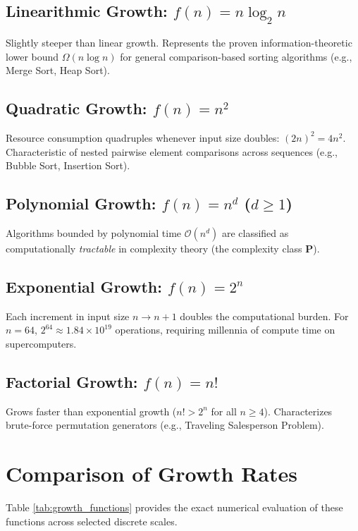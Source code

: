 \documentclass[11pt,a4paper,oneside]{report}
\theoremstyle{definition}
\begin{document}
\subsection{Linearithmic Growth: $f(n) = n \log_2 n$}
Slightly steeper than linear growth. Represents the proven information-theoretic lower bound $\Omega(n \log n)$ for general comparison-based sorting algorithms (e.g., Merge Sort, Heap Sort).

\subsection{Quadratic Growth: $f(n) = n^2$}
Resource consumption quadruples whenever input size doubles: $(2n)^2 = 4n^2$. Characteristic of nested pairwise element comparisons across sequences (e.g., Bubble Sort, Insertion Sort).

\subsection{Polynomial Growth: $f(n) = n^d$ ($d \ge 1$)}
Algorithms bounded by polynomial time $\mathcal{O}(n^d)$ are classified as computationally \emph{tractable} in complexity theory (the complexity class $\mathbf{P}$).

\subsection{Exponential Growth: $f(n) = 2^n$}
Each increment in input size $n \to n + 1$ doubles the computational burden. For $n = 64$, $2^{64} \approx 1.84 \times 10^{19}$ operations, requiring millennia of compute time on supercomputers.

\subsection{Factorial Growth: $f(n) = n!$}
Grows faster than exponential growth ($n! > 2^n$ for all $n \ge 4$). Characterizes brute-force permutation generators (e.g., Traveling Salesperson Problem).

\section{Comparison of Growth Rates}
Table \ref{tab:growth_functions} provides the exact numerical evaluation of these functions across selected discrete scales.
\end{document}
